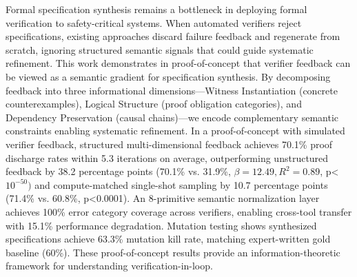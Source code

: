 
Formal specification synthesis remains a bottleneck in deploying formal verification to safety-critical systems. When automated verifiers reject specifications, existing approaches discard failure feedback and regenerate from scratch, ignoring structured semantic signals that could guide systematic refinement. This work demonstrates in proof-of-concept that verifier feedback can be viewed as a semantic gradient for specification synthesis. By decomposing feedback into three informational dimensions---Witness Instantiation (concrete counterexamples), Logical Structure (proof obligation categories), and Dependency Preservation (causal chains)---we encode complementary semantic constraints enabling systematic refinement. In a proof-of-concept with simulated verifier feedback, structured multi-dimensional feedback achieves 70.1\% proof discharge rates within 5.3 iterations on average, outperforming unstructured feedback by 38.2 percentage points (70.1\% vs. 31.9\%, $\beta =12.49, R^{2}=0.89$, p<$10^{-50})$ and compute-matched single-shot sampling by 10.7 percentage points (71.4\% vs. 60.8\%, p<0.0001). An 8-primitive semantic normalization layer achieves 100\% error category coverage across verifiers, enabling cross-tool transfer with 15.1\% performance degradation. Mutation testing shows synthesized specifications achieve 63.3\% mutation kill rate, matching expert-written gold baseline (60\%). These proof-of-concept results provide an information-theoretic framework for understanding verification-in-loop.
